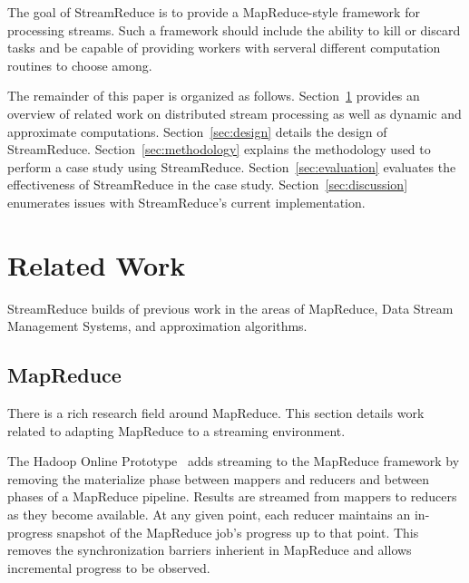 \documentclass[12pt,twocolumn]{article}
\begin{document}
The goal of StreamReduce is to provide a MapReduce-style framework for processing streams. Such a
framework should include the ability to kill or discard tasks and be capable of
providing workers with serveral different computation routines to choose among.

The remainder of this paper is organized as follows. Section~\ref{sec:relwork} provides
an overview of related work on distributed stream processing as well as dynamic and
approximate computations. Section~\ref{sec:design} details the design of StreamReduce.
Section~\ref{sec:methodology} explains the methodology used to perform a case study
using StreamReduce. Section~\ref{sec:evaluation} evaluates the effectiveness of StreamReduce in the case study.
Section~\ref{sec:discussion} enumerates issues with StreamReduce's current implementation.

\section{Related Work}
\label{sec:relwork}
%

StreamReduce builds of previous work in the areas of MapReduce, Data Stream Management Systems,
and approximation algorithms.

\subsection{MapReduce}
There is a rich research field around MapReduce. This section details work related to adapting
MapReduce to a streaming environment.

The Hadoop Online Prototype~\cite{Condie:EECS-2009-136} adds streaming to the MapReduce framework
by removing the materialize phase between mappers and reducers and between phases of a
MapReduce pipeline. Results are streamed from mappers to reducers as they become available.
At any given point, each reducer maintains an in-progress snapshot of the MapReduce job's
progress up to that point. This removes the synchronization barriers inherient in MapReduce
and allows incremental progress to be observed.
\end{document}
